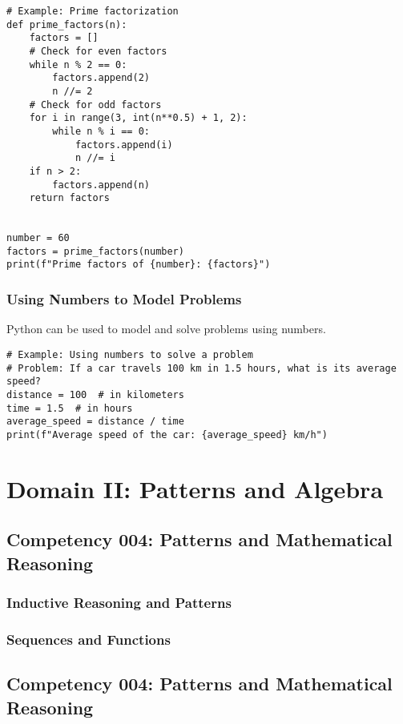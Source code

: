 \documentclass{book}
\begin{document}
\begin{lstlisting}[style=pythonstyle]
# Example: Prime factorization
def prime_factors(n):
    factors = []
    # Check for even factors
    while n % 2 == 0:
        factors.append(2)
        n //= 2
    # Check for odd factors
    for i in range(3, int(n**0.5) + 1, 2):
        while n % i == 0:
            factors.append(i)
            n //= i
    if n > 2:
        factors.append(n)
    return factors


number = 60
factors = prime_factors(number)
print(f"Prime factors of {number}: {factors}")
\end{lstlisting}


\subsection{Using Numbers to Model Problems}
Python can be used to model and solve problems using numbers.


\begin{lstlisting}[style=pythonstyle]
# Example: Using numbers to solve a problem
# Problem: If a car travels 100 km in 1.5 hours, what is its average speed?
distance = 100  # in kilometers
time = 1.5  # in hours
average_speed = distance / time
print(f"Average speed of the car: {average_speed} km/h")
\end{lstlisting}




\chapter{Domain II: Patterns and Algebra}

\section{Competency 004: Patterns and Mathematical Reasoning}
\subsection{Inductive Reasoning and Patterns}
\subsection{Sequences and Functions}


\section{Competency 004: Patterns and Mathematical Reasoning}
\end{document}
